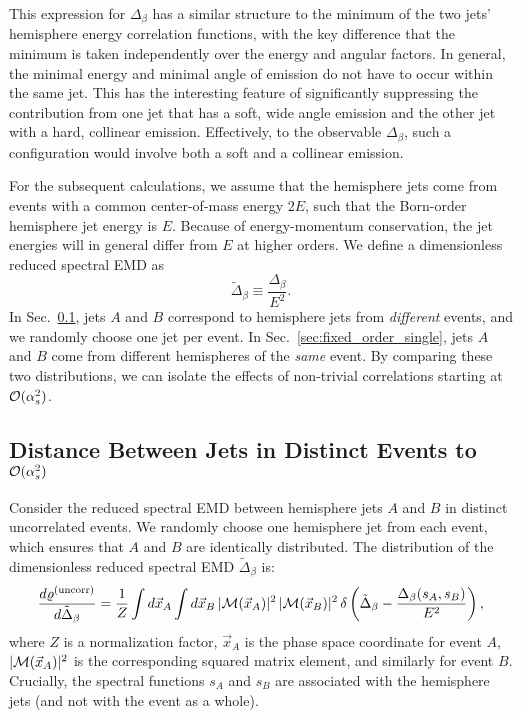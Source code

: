\documentclass[letterpaper,11pt]{article}
\DeclareRobustCommand{\Sec}[1]{Sec.~\ref{#1}}
\begin{document}
This expression for $\Delta_\beta$ has a similar structure to the minimum of the two jets' hemisphere energy correlation functions, with the key difference that the minimum is taken independently over the energy and angular factors.  
%
In general, the minimal energy and minimal angle of emission do not have to occur within the same jet.  
%
This has the interesting feature of significantly suppressing the contribution from one jet that has a soft, wide angle emission and the other jet with a hard, collinear emission.  
%
Effectively, to the observable $\Delta_\beta$, such a configuration would involve both a soft and a collinear emission.


For the subsequent calculations, we assume that the hemisphere jets come from events with a common center-of-mass energy $2E$, such that the Born-order hemisphere jet energy is $E$.
%
Because of energy-momentum conservation, the jet energies will in general differ from $E$ at higher orders. 
%
We define a dimensionless reduced spectral EMD as
%
\begin{equation}
\tilde{\Delta}_\beta \equiv \frac{\Delta_\beta}{E^2}.
\end{equation}
%
In \Sec{sec:fixed_order_double}, jets $A$ and $B$ correspond to hemisphere jets from \emph{different} events, and we randomly choose one jet per event.
%
In \Sec{sec:fixed_order_single}, jets $A$ and $B$ come from different hemispheres of the \emph{same} event.
%
By comparing these two distributions, we can isolate the effects of non-trivial correlations starting at ${\cal O}(\alpha_s^2)$.


\subsection{Distance Between Jets in Distinct Events to ${\cal O}(\alpha_s^2)$}
\label{sec:fixed_order_double}


Consider the reduced spectral EMD between hemisphere jets $A$ and $B$ in distinct uncorrelated events.
%
We randomly choose one hemisphere jet from each event, which ensures that $A$ and $B$ are identically distributed.
%
The distribution of the dimensionless reduced spectral EMD $\tilde{\Delta}_\beta$ is:
%
\begin{align}
\frac{d\varrho^{(\text{uncorr})}}{d \tilde \Delta_\beta} = \frac{1}{Z} \int d\vec x_A \int d\vec x_B\, |{\cal M}(\vec x_A)|^2\, |{\cal M}(\vec x_B)|^2\,\delta\left(\tilde \Delta_\beta - \frac{\Delta_\beta(s_A, s_B)}{E^2} \right),
\end{align}
%
where $Z$ is a normalization factor, $\vec x_A$ is the phase space coordinate for event $A$, $|{\cal M}(\vec x_A)|^2$ is the corresponding squared matrix element, and similarly for event $B$. 
%
Crucially, the spectral functions $s_A$ and $s_B$ are associated with the hemisphere jets (and not with the event as a whole).
\end{document}
